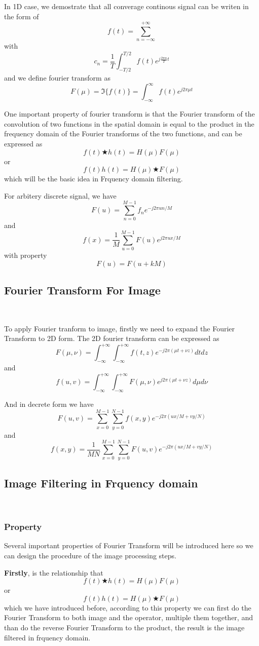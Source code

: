 \documentclass[
	12pt, %
]{style/fphw}
\begin{document}
In 1D case, we demostrate that all converage continous signal can be writen in the form of $$f(t)=\sum_{n=-\infty}^{+\infty}$$ with $$c_n=\frac{1}{T} \int_{-T/2}^{T/2}f(t)e^{j\frac{2\pi n}{T}t}$$ and we define fourier transform as $$F(\mu) = \Im\{f(t)\} = \int_{-\infty}^{\infty}f(t)e^{j2\pi \mu t} $$

One important property of fourier transform is that the Fourier transform of the convolution of two functions in the spatial domain is equal to the product in the frequency domain of the Fourier transforms of the two functions, and can be expressed as $$f(t)\bigstar h(t)=H(\mu)F(\mu)$$ or $$f(t) h(t)=H(\mu) \bigstar F(\mu)$$ which will be the basic idea in Frquency domain filtering.

For arbitery discrete signal, we have $$F(u) = \sum_{n=0}^{M-1}f_n e^{-j2\pi un/M}$$ and $$f(x)=\frac{1}{M} \sum_{u=0}^{M-1} F(u)e^{j2\pi ux/M}$$ with property $$F(u)=F(u+kM)$$

\subsection*{Fourier Transform For Image} \

To apply Fourier tranform to image, firstly we need to expand the Fourier Transform to 2D form. The 2D fourier transform can be expressed as $$F(\mu,\nu)=\int_{-\infty}^{+\infty}\int_{-\infty}^{+\infty}f(t,z)e^{-j2\pi (\mu t + \nu z)}dtdz$$ and $$f(u,v)=\int_{-\infty}^{+\infty}\int_{-\infty}^{+\infty}F(\mu,\nu)e^{j2\pi (\mu t + \nu z)}d\mu d\nu$$ 

And in decrete form we have $$F(u,v)= \sum_{x=0}^{M-1}\sum_{y=0}^{N-1}f(x,y)e^{-j2\pi (ux/M + vy/N)}$$ and $$f(x,y)=\frac{1}{MN}\sum_{x=0}^{M-1}\sum_{y=0}^{N-1}F(u,v)e^{-j2\pi (ux/M + vy/N)}$$

\subsection*{Image Filtering in Frquency domain} \

\subsubsection*{Property}

Several important properties of Fourier Transform will be introduced here so we can design the procedure of the image processing steps.

\textbf{Firstly}, is the relationship that $$f(t)\bigstar h(t)=H(\mu)F(\mu)$$ or $$f(t) h(t)=H(\mu) \bigstar F(\mu)$$ which we have introduced before, according to this property we can first do the Fourier Transform to both image and the operator, multiple them together, and than do the reverse Fourier Transform to the product, the result is the image filtered in frquency domain. 
\end{document}
